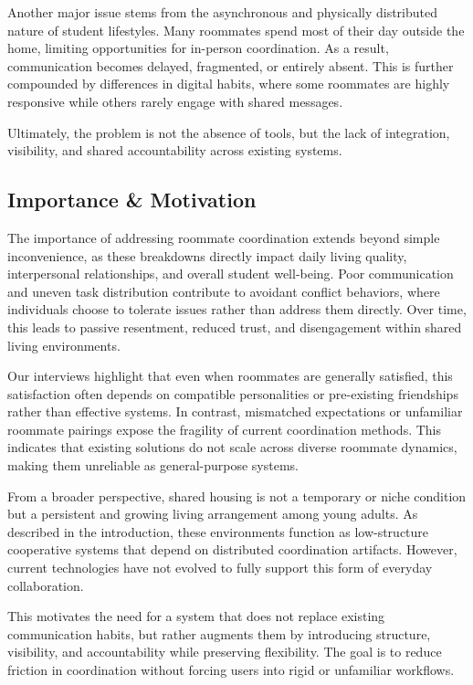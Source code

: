 \documentclass[sigconf]{acmart}
\begin{document}
Another major issue stems from the asynchronous and physically distributed nature of student lifestyles. Many roommates spend most of their day outside the home, limiting opportunities for in-person coordination. As a result, communication becomes delayed, fragmented, or entirely absent. This is further compounded by differences in digital habits, where some roommates are highly responsive while others rarely engage with shared messages.

Ultimately, the problem is not the absence of tools, but the lack of integration, visibility, and shared accountability across existing systems.

\subsection{Importance \& Motivation}
The importance of addressing roommate coordination extends beyond simple inconvenience, as these breakdowns directly impact daily living quality, interpersonal relationships, and overall student well-being. Poor communication and uneven task distribution contribute to avoidant conflict behaviors, where individuals choose to tolerate issues rather than address them directly. Over time, this leads to passive resentment, reduced trust, and disengagement within shared living environments.

Our interviews highlight that even when roommates are generally satisfied, this satisfaction often depends on compatible personalities or pre-existing friendships rather than effective systems. In contrast, mismatched expectations or unfamiliar roommate pairings expose the fragility of current coordination methods. This indicates that existing solutions do not scale across diverse roommate dynamics, making them unreliable as general-purpose systems.

From a broader perspective, shared housing is not a temporary or niche condition but a persistent and growing living arrangement among young adults. As described in the introduction, these environments function as low-structure cooperative systems that depend on distributed coordination artifacts. However, current technologies have not evolved to fully support this form of everyday collaboration.

This motivates the need for a system that does not replace existing communication habits, but rather augments them by introducing structure, visibility, and accountability while preserving flexibility. The goal is to reduce friction in coordination without forcing users into rigid or unfamiliar workflows.
\end{document}
